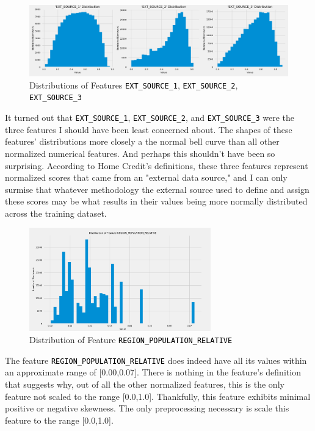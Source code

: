 \documentclass[12pt, letterpaper]{article}
\begin{document}
\begin{figure}[ht]
\includegraphics[width=\textwidth]{distribsEXTSOURCE1EXTSOURCE2EXTSOURCE3}
\centering
\caption{Distributions of Features \colorbox{backcolor}{\textcolor{black}{\texttt{EXT_SOURCE_1}}}, \colorbox{backcolor}{\textcolor{black}{\texttt{EXT_SOURCE_2}}}, \colorbox{backcolor}{\textcolor{black}{\texttt{EXT_SOURCE_3}}}}
\end{figure}

It turned out that \colorbox{backcolor}{\textcolor{black}{\texttt{EXT_SOURCE_1}}}, \colorbox{backcolor}{\textcolor{black}{\texttt{EXT_SOURCE_2}}}, and \colorbox{backcolor}{\textcolor{black}{\texttt{EXT_SOURCE_3}}} were the three features I should have been least concerned about. The shapes of these features' distributions more closely a the normal bell curve than all other normalized numerical features. And perhaps this shouldn't have been so surprising. According to Home Credit's definitions, these three features represent normalized scores that came from an "external data source," and I can only surmise that whatever methodology the external source used to define and assign these scores may be what results in their values being more normally distributed across the training dataset.

\begin{figure}[ht]
\includegraphics[width=0.7\textwidth]{distribREGIONPOPULATIONRELATIVE}
\centering
\caption{Distribution of Feature \colorbox{backcolor}{\textcolor{black}{\texttt{REGION_POPULATION_RELATIVE}}}}
\end{figure}

The feature \colorbox{backcolor}{\textcolor{black}{\texttt{REGION_POPULATION_RELATIVE}}} does indeed have all its values within an approximate range of [0.00,0.07]. There is nothing in the feature's definition that suggests why, out of all the other normalized features, this is the only feature not scaled to the range [0.0,1.0]. Thankfully, this feature exhibits minimal positive or negative skewness. The only preprocessing necessary is scale this feature to the range [0.0,1.0].
\end{document}
